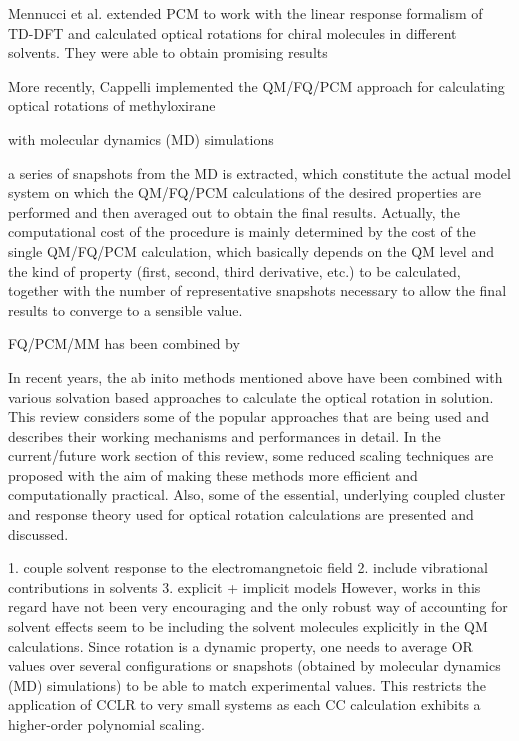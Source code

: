 Mennucci et al. extended PCM to work with the linear response formalism of TD-DFT\cite{Mennucci02}
and calculated optical rotations for chiral molecules in different solvents. They were able to obtain promising results

More recently, Cappelli implemented the
QM/FQ/PCM approach for calculating optical rotations of methyloxirane


with molecular dynamics (MD) simulations



 a series of snapshots from the MD is extracted, which constitute the actual model system on which the QM/FQ/PCM calculations of the desired properties are performed and then averaged out to obtain the final results. Actually, the computational cost of the procedure is mainly determined by the cost of the single QM/FQ/PCM calculation, which basically depends on the QM level and the kind of property (first, second, third derivative, etc.) to be calculated, together with the number of representative snapshots necessary to allow the final results to converge to a sensible value.



FQ/PCM/MM has been combined by

In recent years, the ab inito methods
mentioned above have been combined with various solvation based
approaches\cite{Neugebauer05,Neugebauer09,Mennucci02,Tomasi05,JensenGordon96}
to calculate the optical rotation in solution. This review considers some of
the popular approaches that are being used and describes their working
mechanisms and performances in detail. In the current/future work section of
this review, some reduced scaling techniques are proposed with the aim of
making these methods more efficient and computationally practical. Also, some
of the essential, underlying coupled cluster and response theory used for
optical rotation calculations are presented and discussed.

1. couple solvent response to the electromangnetoic field
2. include vibrational contributions in solvents
3. explicit + implicit models
However, works in this regard have not been very encouraging\cite{silva04,Stephens001,Kongsted05,Mennucci02} 
and the only robust way of accounting for solvent effects seem to be including the solvent molecules explicitly 
in the QM calculations. Since rotation is a dynamic property, one needs to average OR values over several 
configurations or snapshots (obtained by molecular dynamics (MD) simulations) to be able to match experimental 
values. This restricts the application of CCLR to very small systems as each CC calculation exhibits
a higher-order polynomial scaling.

